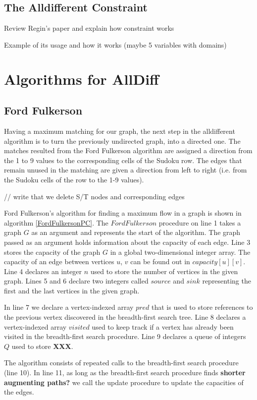 \documentclass{l4proj}
\begin{document}
\section{The Alldifferent Constraint}
Review Regin’s paper and explain how constraint works

Example of  its usage and how it works (maybe 5 variables with domains)

 
\chapter{Algorithms for AllDiff}
\section{Ford Fulkerson}
Having a maximum matching for our graph, the next step in the alldifferent algorithm is to turn the previously undirected graph, into a directed one. The matches resulted from the Ford Fulkerson algorithm are assigned a direction from the 1 to 9 values to the corresponding cells of the Sudoku row. The edges that remain unused in the matching are given a direction from left to right (i.e. from the Sudoku cells of the row to the 1-9 values).

\noindent // write that we delete S/T nodes and corresponding edges

\noindent Ford Fulkerson's algorithm for finding a maximum flow in a graph is shown in algorithm \ref{FordFulkersonPC}. The $Ford Fulkerson$ procedure on line 1 takes a graph $G$ as an argument and represents the start of the algorithm. The graph passed as an argument holds information about the capacity of each edge. Line 3 stores the capacity of the graph $G$ in a global two-dimensional integer array. The capacity of an edge between vertices $u$, $v$ can be found out in $capacity[u][v]$. Line 4 declares an integer $n$ used to store the number of vertices in the given graph. Lines 5 and 6 declare two integers called $source$ and $sink$ representing the first and the last vertices in the given graph.

\noindent In line 7 we declare a vertex-indexed array $pred$ that is used to store references to the previous vertex discovered in the breadth-first search tree. Line 8 declares a vertex-indexed array $visited$ used to keep track if a vertex has already been visited in the breadth-first search procedure. Line 9 declares a queue of integers $Q$ used to store \textbf{XXX}.

\noindent The algorithm consists of repeated calls to the breadth-first search procedure (line 10). In line 11, as long as the breadth-first search procedure finds \textbf{shorter augmenting paths?} we call the update procedure to update the capacities of the edges.
\end{document}
